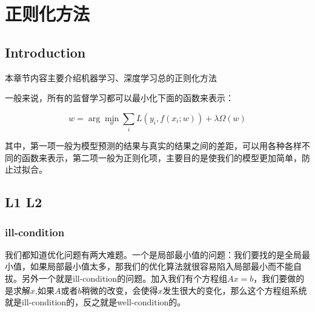 \chapter{正则化方法}

\section*{Introduction}
	本章节内容主要介绍机器学习、深度学习总的正则化方法
	
	一般来说，所有的监督学习都可以最小化下面的函数来表示：
	
	\begin{equation}
		w = \arg \min_{w} \sum_{i}L(y_i,f(x_i;w)) + \lambda \Omega(w)
	\end{equation}
	
	其中，第一项一般为模型预测的结果与真实的结果之间的差距，可以用各种各样不同的函数来表示，第二项一般为正则化项，主要目的是使我们的模型更加简单，防止过拟合。

\section{L1 L2}
	\boldmath  %
	
	\subsection{ill-condition}
	我们都知道优化问题有两大难题。一个是局部最小值的问题：我们要找的是全局最小值，如果局部最小值太多，那我们的优化算法就很容易陷入局部最小而不能自拔。另外一个就是ill-condition的问题。加入我们有个方程组$Ax=b$，我们要做的是求解$x$,如果$A$或者$b$稍微的改变，会使得$x$发生很大的变化，那么这个方程组系统就是ill-condition的，反之就是well-condition的。